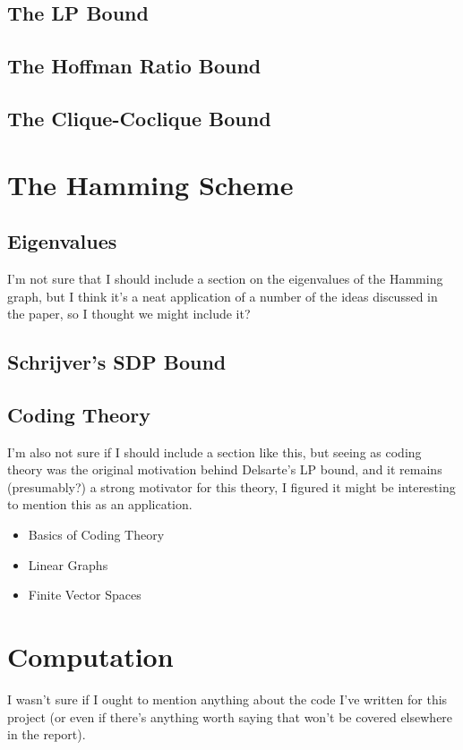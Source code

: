 \documentclass{report}
\begin{document}
  \section{The LP Bound}

  \section{The Hoffman Ratio Bound}

  \section{The Clique-Coclique Bound}

\chapter{The Hamming Scheme}
  \section{Eigenvalues}
    I'm not sure that I should include a section on the eigenvalues of the Hamming
    graph, but I think it's a neat application of a number of the ideas discussed
    in the paper, so I thought we might include it?

  \section{Schrijver's SDP Bound}

  \section{Coding Theory}
    I'm also not sure if I should include a section like this, but seeing as
    coding theory was the original motivation behind Delsarte's LP bound,
    and it remains (presumably?) a strong motivator for this theory,
    I figured it might be interesting to mention this as an application.

    \begin{itemize}
      \item Basics of Coding Theory
      \item Linear Graphs
      \item Finite Vector Spaces
    \end{itemize}

\chapter{Computation}
  I wasn't sure if I ought to mention anything about the code I've written for
  this project (or even if there's anything worth saying that won't be covered
  elsewhere in the report).
\end{document}
